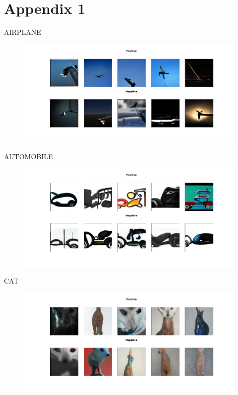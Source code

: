 \documentclass[11pt,a4paper,openany]{book}
\begin{document}
\chapter{Appendix 1}
\noindent AIRPLANE
\begin{figure}[h!]
    \centering
    \includegraphics[scale=0.4]{figs/cifar10_examples/airplane.png}
\end{figure}
\newline
AUTOMOBILE
\begin{figure}[h!]
    \centering
    \includegraphics[scale=0.4]{figs/cifar10_examples/automobile.png}
\end{figure}
\newpage
\noindent CAT
\begin{figure}[h!]
    \centering
    \includegraphics[scale=0.4]{figs/cifar10_examples/cat.png}
\end{figure}
\end{document}
